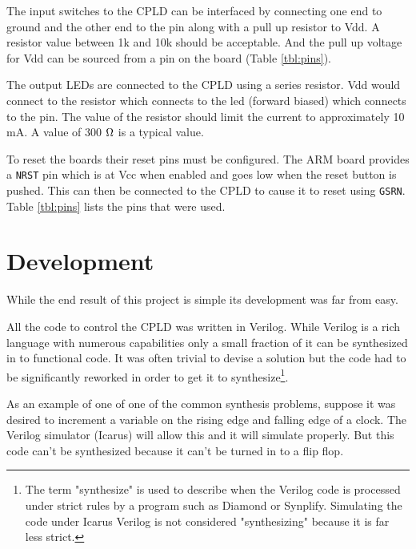 \documentclass{article}
\begin{document}
The input switches to the CPLD can be interfaced by connecting
one end to ground and the other end to the pin along with a
pull up resistor to Vdd.
A resistor value between 1k and 10k should be acceptable.
And the pull up voltage for Vdd can be sourced from a pin on
the board (Table \ref{tbl:pins}).

The output LEDs are connected to the CPLD using a series
resistor.
Vdd would connect to the resistor which connects to the led
(forward biased) which connects to the pin.
The value of the resistor should limit the current to approximately
10 mA.
A value of 300 $\ohm$ is a typical value.

To reset the boards their reset pins must be configured.
The ARM board provides a \verb+NRST+ pin which is at Vcc
when enabled and goes low when the reset button is pushed\cite[Pg. 17, 20]{UM1079}.
This can then be connected to the CPLD to cause
it to reset using \verb+GSRN+\citetext{\citealp[Pg. 13, 46, 50, 53]{DS1002}; \citealp[Pg. 8]{EB66}}.
Table \ref{tbl:pins} lists the pins that were used.

\clearpage


\section{Development}

While the end result of this project is simple its development
was far from easy.

All the code to control the CPLD was written in Verilog.
While Verilog is a rich language with numerous
capabilities\cite{thomas2002verilog} only a small fraction of it
can be synthesized in to functional code.
It was often trivial to devise a solution
but the code had to be significantly reworked in order to get it to
synthesize\footnote{The term "synthesize" is used to describe when
the Verilog code is processed under strict rules by a program such
as Diamond or Synplify.  Simulating the code under Icarus Verilog
is not considered "synthesizing" because it is far less strict.}.

As an example of one of one of the common synthesis problems,
suppose it was desired to increment a variable on the rising
edge and falling edge of a clock.
The Verilog simulator (Icarus) will allow this and it will simulate
properly.
But this code can't be synthesized because it can't be turned in to a flip flop.
\end{document}
